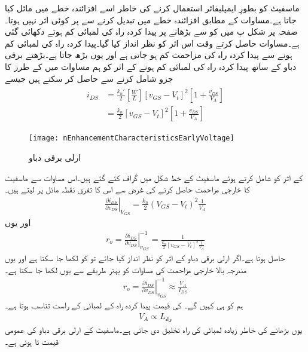 ماسفیٹ کو بطورِ ایمپلیفائر استعمال کرنے کی خاطر اسے افزائندہ خطے میں مائل کیا جاتا ہے۔مساوات   کے مطابق افزائندہ خطے میں  تبدیل کرنے سے  پر کوئی اثر نہیں ہوتا۔صفحہ \pageref{شکل_بڑھاتے_ماسفیٹ_کے_خط_منفی}  پر شکل  پ میں   کو  سے بڑھانے پر پیدا کردہ راہ کی لمبائی کم ہوتے دکھائی گئی ہے۔مساوات   حاصل کرتے وقت اس اثر کو نظر انداز کیا گیا۔پیدا کردہ راہ کی لمبائی کم ہونے سے پیدا کردہ راہ کی مزاحمت کم ہو جاتی ہے اور یوں  بڑھ جاتا ہے۔بڑھتے برقی دباو کے ساتھ پیدا کردہ راہ کی لمبائی کم ہونے کے اثر کو ہم مساوات   میں    کے طرز کا جزو شامل کرنے سے حاصل کر سکتے ہیں جیسے
\begin{gather}
\begin{aligned}
i_{DS}&=\frac{k_n'}{2} \left[\frac{W}{L} \right ] \left[v_{GS}-V_t \right ]^{2} \left [1+\frac{v_{DS}}{V_A} \right ]\\
&=\frac{k_n}{2} \left[v_{GS}-V_t \right ]^{2} \left [1+\frac{v_{DS}}{V_A} \right ]
\end{aligned}
\end{gather}
%
\begin{figure}
\centering
\texttt{[image: nEnhancementCharacteristicsEarlyVoltage]}
\caption{ارلی برقی دباو}
\label{شکل_ماسفیٹ_ارلی_برقی_دباو}
\end{figure}

 کے اثر کو شامل کرتے ہوئے ماسفیٹ کے خط شکل  میں گراف کئے گئے ہیں۔اس مساوات سے ماسفیٹ کا خارجی مزاحمت حاصل کرنے کی غرض سے اس کا تفرق نقطہ مائل پر لیتے ہیں۔
\begin{align*}
\left . \frac{\partial i_{DS}}{\partial v_{DS}}  \right  |_{V_{GS}} = \frac{k_n}{2} \left(V_{GS}-V_t  \right)^2  \frac{1}{V_A}
\end{align*}
اور یوں 
\begin{align}
r_o=\left. \frac{\partial i_{DS}}{\partial v_{DS}} \right |_{v_{GS}}^{-1}=\frac{1}{\frac{k_n}{2} \left[v_{GS}-V_t \right ]^2 \frac{1}{V_A}}
\end{align}
حاصل ہوتا ہے۔اگر ارلی برقی دباو کے اثر کو نظر انداز کیا جائے تو  کو  لکھا جا سکتا ہے اور یوں مندرجہ بالا خارجی مزاحمت کی مساوات کو بہتر طریقے سے یوں لکھا جا سکتا ہے۔
\begin{align} \label{مساوات_میدانی_خارجی_مزاحمت}
r_o=\left. \frac{\partial i_{DS}}{\partial v_{DS}} \right |_{v_{GS}}^{-1} \approx \frac{V_A}{I_{DS}}
\end{align}
ہم  کو  ہی کہیں گے۔ کی قیمت پیدا کردہ راہ کے لمبائی کے  راست تناسب ہوتا ہے۔
\begin{align}
V_A \propto L_{\text{راہ}}
\end{align}
یوں  بڑھانے کی خاطر زیادہ لمبائی کی راہ تخلیق دی جاتی ہے۔ماسفیٹ کے ارلی برقی دباو کی عمومی قیمت  تا  ہوتی ہے۔

